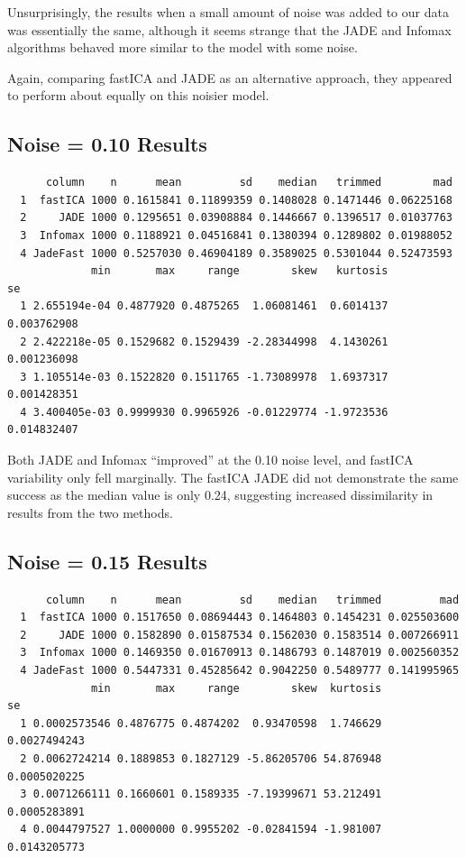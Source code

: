 \documentclass[12pt,twoside]{amherstthesis}
\begin{document}
  Unsurprisingly, the results when a small amount of noise was added to
  our data was essentially the same, although it seems strange that the
  JADE and Infomax algorithms behaved more similar to the model with some
  noise.
  
  Again, comparing fastICA and JADE as an alternative approach, they
  appeared to perform about equally on this noisier model.
  
  \subsection{Noise = 0.10 Results}\label{noise-0.10-results}
  
  \begin{verbatim}
      column    n      mean         sd    median   trimmed        mad
  1  fastICA 1000 0.1615841 0.11899359 0.1408028 0.1471446 0.06225168
  2     JADE 1000 0.1295651 0.03908884 0.1446667 0.1396517 0.01037763
  3  Infomax 1000 0.1188921 0.04516841 0.1380394 0.1289802 0.01988052
  4 JadeFast 1000 0.5257030 0.46904189 0.3589025 0.5301044 0.52473593
             min       max     range        skew   kurtosis          se
  1 2.655194e-04 0.4877920 0.4875265  1.06081461  0.6014137 0.003762908
  2 2.422218e-05 0.1529682 0.1529439 -2.28344998  4.1430261 0.001236098
  3 1.105514e-03 0.1522820 0.1511765 -1.73089978  1.6937317 0.001428351
  4 3.400405e-03 0.9999930 0.9965926 -0.01229774 -1.9723536 0.014832407
  \end{verbatim}
  
  Both JADE and Infomax ``improved'' at the 0.10 noise level, and fastICA
  variability only fell marginally. The fastICA JADE did not demonstrate
  the same success as the median value is only 0.24, suggesting increased
  dissimilarity in results from the two methods.
  
  \subsection{Noise = 0.15 Results}\label{noise-0.15-results}
  
  \begin{verbatim}
      column    n      mean         sd    median   trimmed         mad
  1  fastICA 1000 0.1517650 0.08694443 0.1464803 0.1454231 0.025503600
  2     JADE 1000 0.1582890 0.01587534 0.1562030 0.1583514 0.007266911
  3  Infomax 1000 0.1469350 0.01670913 0.1486793 0.1487019 0.002560352
  4 JadeFast 1000 0.5447331 0.45285642 0.9042250 0.5489777 0.141995965
             min       max     range        skew  kurtosis           se
  1 0.0002573546 0.4876775 0.4874202  0.93470598  1.746629 0.0027494243
  2 0.0062724214 0.1889853 0.1827129 -5.86205706 54.876948 0.0005020225
  3 0.0071266111 0.1660601 0.1589335 -7.19399671 53.212491 0.0005283891
  4 0.0044797527 1.0000000 0.9955202 -0.02841594 -1.981007 0.0143205773
  \end{verbatim}
  
\end{document}
